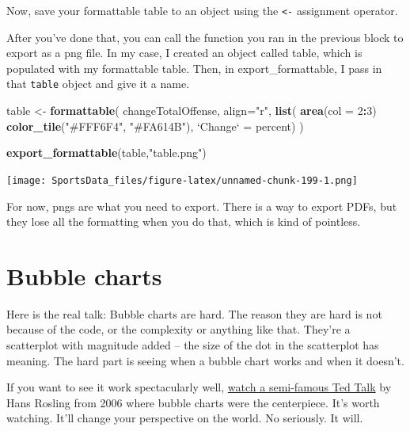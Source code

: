 \documentclass[]{book}
\newenvironment{Shaded}{\begin{snugshade}}{\end{snugshade}}
\newcommand{\DataTypeTok}[1]{\textcolor[rgb]{0.13,0.29,0.53}{#1}}
\newcommand{\DecValTok}[1]{\textcolor[rgb]{0.00,0.00,0.81}{#1}}
\newcommand{\KeywordTok}[1]{\textcolor[rgb]{0.13,0.29,0.53}{\textbf{#1}}}
\newcommand{\NormalTok}[1]{#1}
\newcommand{\OperatorTok}[1]{\textcolor[rgb]{0.81,0.36,0.00}{\textbf{#1}}}
\newcommand{\StringTok}[1]{\textcolor[rgb]{0.31,0.60,0.02}{#1}}
\begin{document}
Now, save your formattable table to an object using the \texttt{\textless{}-} assignment operator.

After you've done that, you can call the function you ran in the previous block to export as a png file. In my case, I created an object called table, which is populated with my formattable table. Then, in export\_formattable, I pass in that \texttt{table} object and give it a name.

\begin{Shaded}
\begin{Highlighting}[]
\NormalTok{table <-}\StringTok{ }\KeywordTok{formattable}\NormalTok{(}
\NormalTok{  changeTotalOffense, }
  \DataTypeTok{align=}\StringTok{"r"}\NormalTok{,}
  \KeywordTok{list}\NormalTok{(}
     \KeywordTok{area}\NormalTok{(}\DataTypeTok{col =} \DecValTok{2}\OperatorTok{:}\DecValTok{3}\NormalTok{) }\OperatorTok{~}\StringTok{ }\KeywordTok{color_tile}\NormalTok{(}\StringTok{"#FFF6F4"}\NormalTok{, }\StringTok{"#FA614B"}\NormalTok{),}
    \StringTok{`}\DataTypeTok{Change}\StringTok{`}\NormalTok{ =}\StringTok{ }\NormalTok{percent)}
\NormalTok{  )}

\KeywordTok{export_formattable}\NormalTok{(table,}\StringTok{"table.png"}\NormalTok{)}
\end{Highlighting}
\end{Shaded}

\texttt{[image: SportsData\_files/figure-latex/unnamed-chunk-199-1.png]}

For now, pngs are what you need to export. There is a way to export PDFs, but they lose all the formatting when you do that, which is kind of pointless.

\hypertarget{bubble-charts}{%
\chapter{Bubble charts}\label{bubble-charts}}

Here is the real talk: Bubble charts are hard. The reason they are hard is not because of the code, or the complexity or anything like that. They're a scatterplot with magnitude added -- the size of the dot in the scatterplot has meaning. The hard part is seeing when a bubble chart works and when it doesn't.

If you want to see it work spectacularly well, \href{https://www.youtube.com/watch?v=hVimVzgtD6w}{watch a semi-famous Ted Talk} by Hans Rosling from 2006 where bubble charts were the centerpiece. It's worth watching. It'll change your perspective on the world. No seriously. It will.
\end{document}
